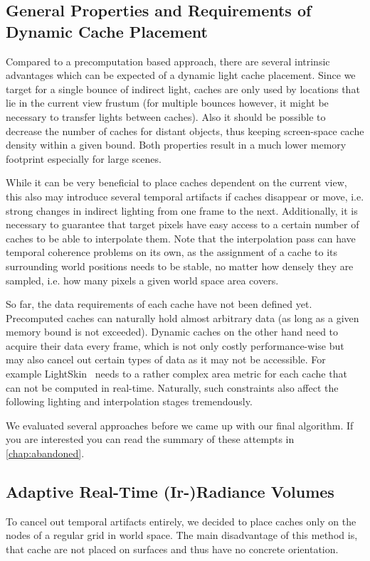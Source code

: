 \documentclass[thesis.tex]{subfiles}
\begin{document}
\subsection{General Properties and Requirements of Dynamic Cache Placement}
Compared to a precomputation based approach, there are several intrinsic advantages which can be expected of a dynamic light cache placement.
Since we target for a single bounce of indirect light, caches are only used by locations that lie in the current view frustum (for multiple bounces however, it might be necessary to transfer lights between caches).
Also it should be possible to decrease the number of caches for distant objects, thus keeping screen-space cache density within a given bound.
Both properties result in a much lower memory footprint especially for large scenes.

While it can be very beneficial to place caches dependent on the current view, this also may introduce several temporal artifacts if caches disappear or move, i.e. strong changes in indirect lighting from one frame to the next.
Additionally, it is necessary to guarantee that target pixels have easy access to a certain number of caches to be able to interpolate them.
Note that the interpolation pass can have temporal coherence problems on its own, as the assignment of a cache to its surrounding world positions needs to be stable, no matter how densely they are sampled, i.e. how many pixels a given world space area covers.

So far, the data requirements of each cache have not been defined yet.
Precomputed caches can naturally hold almost arbitrary data (as long as a given memory bound is not exceeded).
Dynamic caches on the other hand need to acquire their data every frame, which is not only costly performance-wise but may also cancel out certain types of data as it may not be accessible. For example LightSkin~\cite{bib:LightskinPaper} needs to a rather complex area metric for each cache that can not be computed in real-time.
Naturally, such constraints also affect the following lighting and interpolation stages tremendously.

We evaluated several approaches before we came up with our final algorithm.
If you are interested you can read the summary of these attempts in \autoref{chap:abandoned}.

\subsection{Adaptive Real-Time (Ir-)Radiance Volumes} 
To cancel out temporal artifacts entirely, we decided to place caches only on the nodes of a regular grid in world space.
The main disadvantage of this method is, that cache are not placed on surfaces and thus have no concrete orientation.
\end{document}
